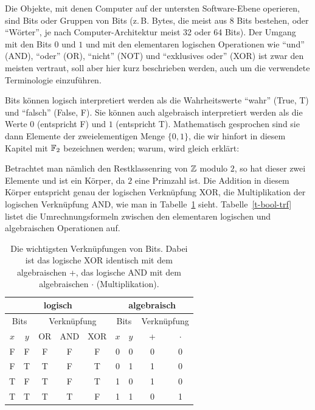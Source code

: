 \begin{refsegment}
Die Objekte, mit denen Computer auf der untersten Software-Ebene operieren,
sind Bits oder Gruppen von Bits (z.\,B. Bytes,
die meist aus 8 Bits bestehen,
oder "`Wörter"', je nach Computer-Architektur meist 32 oder 64 Bits).
Der Umgang mit den Bits $0$ und $1$ und mit den elementaren
logischen Operationen wie "`und"' (AND), "`oder"' (OR),
"`nicht"' (NOT) und "`exklusives oder"' (XOR) ist zwar den meisten
vertraut, soll aber hier kurz beschrieben werden, auch um die verwendete
Terminologie einzuführen.

Bits können logisch interpretiert werden als die
Wahrheitswerte "`wahr"'
(True, T) und "`falsch"' (False, F). Sie können auch algebraisch interpretiert
werden als die Werte $0$ (entspricht F) und $1$ (entspricht T). Mathematisch
gesprochen sind sie dann Elemente der zweielementigen Menge $\{0, 1\}$,
die wir hinfort in diesem Kapitel mit $\mathbb{F}_2$ bezeichnen werden; warum,
wird gleich erklärt:

Betrachtet man nämlich den Restklassenring von $\mathbb{Z}$ modulo $2$, so
hat dieser zwei Elemente und ist ein Körper,
da $2$ eine Primzahl ist. Die Addition in diesem Körper
entspricht genau der logischen Verknüpfung XOR,
die Multiplikation der logischen Verknüpfung AND,
wie man in Tabelle~\ref{t-bool-xor} sieht. Tabelle~\ref{t-bool-trf}
listet die Umrechnungsformeln zwischen den elementaren logischen
und algebraischen Operationen auf.

\begin{table}[h]
\begin{center}
\begin{tabular}{|cc|ccc||cc|cc|} \hline
   \multicolumn{5}{|c||}{\textbf{logisch}} & \multicolumn{4}{c|}{\textbf{algebraisch}} \\ \hline
   \multicolumn{2}{|c|}{Bits} & \multicolumn{3}{|c||}{Verknüpfung} &
        \multicolumn{2}{|c|}{Bits} & \multicolumn{2}{|c|}{Verknüpfung} \\ \hline
   $x$ & $y$ & OR & AND & XOR & $x$ & $y$ & + & $\cdot$ \\ \hline
    F  &  F  & F  &  F  &  F  &  0  &  0  &  0  &  0    \\
    F  &  T  & T  &  F  &  T  &  0  &  1  &  1  &  0    \\
    T  &  F  & T  &  F  &  T  &  1  &  0  &  1  &  0    \\
    T  &  T  & T  &  T  &  F  &  1  &  1  &  0  &  1    \\
   \hline
\end{tabular}
\end{center}
\caption{Die wichtigsten Verknüpfungen von Bits. Dabei ist das logische
  XOR identisch mit dem algebraischen +, das logische AND mit dem
  algebraischen $\cdot$ (Multiplikation).}\label{t-bool-xor}
\end{table}


\end{refsegment}
